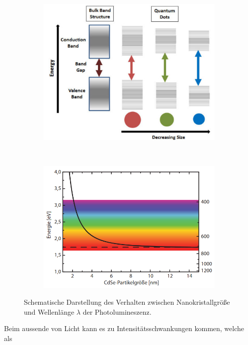 \begin{figure}[H]
\centering
	\begin{subfigure}[t]{0.4\textwidth}
	\includegraphics[width=\textwidth]{Abb/size.png}
	\end{subfigure}
	~
	\begin{subfigure}[t]{0.4\textwidth}
	\includegraphics[width=\textwidth]{Abb/size2.png}
	\end{subfigure}
	\caption{Schematische Darstellung des Verhalten zwischen Nanokristallgröße und
	Wellenlänge $\lambda$ der Photolumineszenz\cite{size}\cite{blink}.}
\label{fig:size}
\end{figure}
\noindent
Beim aussende von Licht kann es zu Intensitätsschwankungen kommen, welche als
